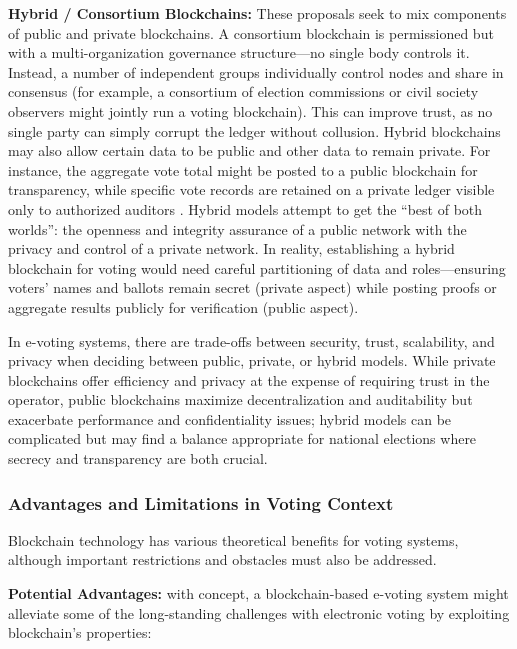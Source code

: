 \documentclass[a4paper,10pt]{report}
\begin{document}
  \textbf  {Hybrid / Consortium Blockchains:}   These proposals seek to mix components of public and private blockchains.   A consortium blockchain is permissioned but with a multi-organization governance structure—no single body controls it.   Instead, a number of independent groups individually control nodes and share in consensus (for example, a consortium of election commissions or civil society observers might jointly run a voting blockchain).   This can improve trust, as no single party can simply corrupt the ledger without collusion.   Hybrid blockchains may also allow certain data to be public and other data to remain private.   For instance, the aggregate vote total might be posted to a public blockchain for transparency, while specific vote records are retained on a private ledger visible only to authorized auditors \cite{linkedin2022blocktypes}.   Hybrid models attempt to get the “best of both worlds”: the openness and integrity assurance of a public network with the privacy and control of a private network.   In reality, establishing a hybrid blockchain for voting would need careful partitioning of data and roles—ensuring voters’ names and ballots remain secret (private aspect) while posting proofs or aggregate results publicly for verification (public aspect).

  In e-voting systems, there are trade-offs between security, trust, scalability, and privacy when deciding between public, private, or hybrid models.   While private blockchains offer efficiency and privacy at the expense of requiring trust in the operator, public blockchains maximize decentralization and auditability but exacerbate performance and confidentiality issues; hybrid models can be complicated but may find a balance appropriate for national elections where secrecy and transparency are both crucial.

\subsubsection{Advantages and Limitations in Voting Context}

Blockchain technology has various theoretical benefits for voting systems, although important restrictions and obstacles must also be addressed.

 \textbf{Potential Advantages:}  
 with concept, a blockchain-based e-voting system might alleviate some of the long-standing challenges with electronic voting by exploiting blockchain’s properties:
\end{document}
